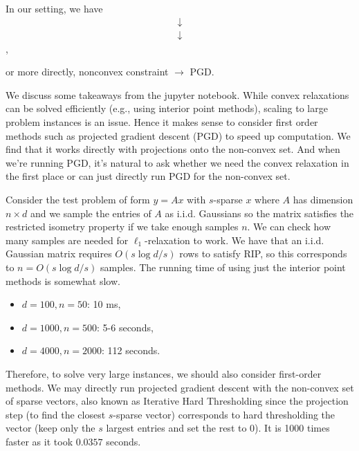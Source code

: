 In our setting, we have \\

\begin{align*}
\downarrow
\end{align*}
\begin{align*}
\downarrow
\end{align*}
,

or more directly, nonconvex constraint $\rightarrow$ PGD.  


We discuss some takeaways from the jupyter notebook. 
While convex relaxations can be solved efficiently (e.g., using interior point methods), scaling to large problem instances is an issue. Hence it makes sense to consider first order methods such as projected gradient descent (PGD) to speed up computation. We find that it works directly with projections onto the non-convex set. And when we're running PGD, it's natural to ask whether we need the convex relaxation in the first place or can just directly run PGD for the non-convex set.

Consider the test problem of form $y = Ax$ with $s$-sparse $x$ where $A$ has dimension $n \times d$ and we sample the entries of $A$ as i.i.d. Gaussians so the matrix satisfies the restricted isometry property if we take enough samples $n$. 
We can check how many samples are needed for $\ell_1$-relaxation to work. We have that an i.i.d. Gaussian matrix requires $O(s \log d/s)$ rows to satisfy RIP, so this corresponds to $n = O(s \log d/s)$ samples. 
The running time of using just the interior point methods is somewhat slow. 
\begin{itemize}
\item $d=100, n=50$: 10 ms, 
\item $d=1000, n=500$: 5-6 seconds,
\item $d=4000, n=2000$: 112 seconds. 
\end{itemize}

Therefore, to solve very large instances, we should also consider first-order methods. We may directly run projected gradient descent with the non-convex set of sparse vectors, also known as Iterative Hard Thresholding since the projection step (to find the closest $s$-sparse vector) corresponds to hard thresholding the vector (keep only the $s$ largest entries and set the rest to 0). It is 1000 times faster as it took $0.0357$ seconds.  




